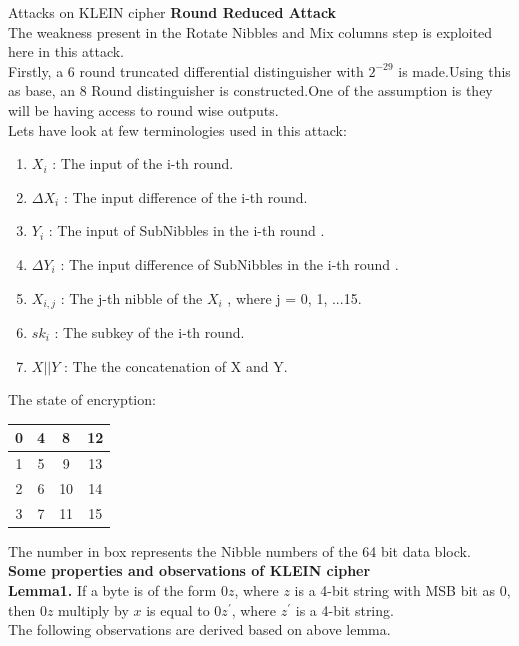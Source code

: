 \begin{frame}{Attacks on KLEIN cipher}
\textbf{Round Reduced Attack}\\
The weakness present in the Rotate Nibbles and Mix columns step is exploited here in this attack.\\
Firstly, a 6 round truncated differential distinguisher with $2^{-29}$ is made.Using this as base, an 8 Round distinguisher is constructed.One of the assumption is they will be having access to round wise outputs.\\
Lets have look at few terminologies used in this attack:\\
\begin{enumerate}
    \item $X_{i}$ : The input of the i-th round.
    \item $\Delta X_{i}$ : The input difference of the i-th round.
    \item $Y_{i}$ : The input of SubNibbles in the i-th round .
    \item $\Delta Y_{i}$ : The input difference of SubNibbles in the i-th round .
    \item $X_{i,j}$ : The j-th nibble of the $X_{i}$ , where j = 0, 1, ...15.
    \item $sk_{i}$ : The subkey of the i-th round.
    \item $X || Y$ : The the concatenation of X and Y.
\end{enumerate}
\end{frame}

\begin{frame}
The state of encryption: \\
\begin{center}
\begin{tabular}{|c|c|c|c|}
\hline
0&4&8&12\\
\hline
1&5&9&13\\
\hline
2&6&10&14 \\
\hline
3&7&11&15\\  
\hline
\end{tabular}
\end{center}
The number in box represents the Nibble numbers of the 64 bit data block.\\
\textbf{Some properties and observations of KLEIN cipher}\\
\textbf{Lemma1.} If a byte is of the form $0z$, where $z$ is a 4-bit string
with MSB bit as 0, then $0z$ multiply by $x$ is equal to $0z^{'}$, where $z ^{'}$
is a 4-bit string.\\
The following observations are derived based on above lemma.\\ \\

\end{frame}

